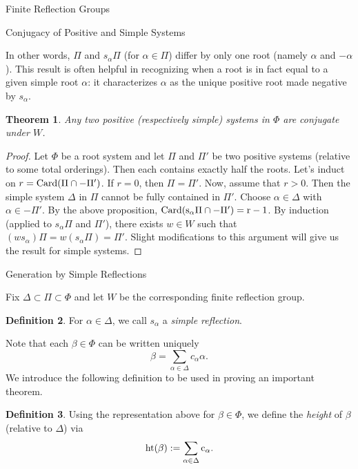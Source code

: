 \documentclass[12pt]{nauthesis}
\newtheorem{theorem}{Theorem}[section]
\theoremstyle{definition}
\newtheorem{definition}[theorem]{Definition}
\renewcommand{\(}{\big(}
\renewcommand{\)}{\big)}
\begin{document}
\begin{flushleft}
\begin{chapter}{Finite Reflection Groups}
\begin{section}{Conjugacy of Positive and Simple Systems}
\medskip

In other words, $\Pi$ and $s_\alpha\Pi$ (for $\alpha \in \Pi$) differ by only one root (namely $\alpha$ and $-\alpha$).  This result is often helpful in recognizing when a root is in fact equal to a given simple root $\alpha$: it characterizes $\alpha$ as the unique positive root made negative by $s_\alpha$.

\medskip

\begin{theorem}
Any two positive (respectively simple) systems in $\Phi$ are conjugate under $W$.
\end{theorem}

\begin{proof}
Let $\Phi$ be a root system and let $\Pi$ and $\Pi'$ be two positive systems (relative to some total orderings).  Then each contains exactly half the roots.  Let's induct on $r=\rm{Card}(\Pi \cap -\Pi')$.  If $r=0$, then $\Pi=\Pi'$.  Now, assume that $r>0$.  Then the simple system $\Delta$ in $\Pi$ cannot be fully contained in $\Pi'$.  Choose $\alpha \in \Delta$ with $\alpha \in -\Pi'$.  By the above proposition, $\rm{Card}(s_\alpha\Pi \cap -\Pi')=r-1$.  By induction (applied to $s_\alpha\Pi$ and $\Pi'$), there exists $w \in W$ such that $(ws_\alpha)\Pi=w(s_\alpha\Pi)=\Pi'$.  Slight modifications to this argument will give us the result for simple systems.
\end{proof}

\end{section}

\begin{section}{Generation by Simple Reflections}

Fix $\Delta \subset \Pi \subset \Phi$ and let $W$ be the corresponding finite reflection group.

\medskip

\begin{definition}
For $\alpha \in \Delta$, we call $s_\alpha$ a \emph{simple reflection}.
\end{definition}

\medskip

Note that each $\beta \in \Phi$ can be written uniquely
	$$\beta=\sum_{\alpha \in \Delta} c_\alpha \alpha.$$
We introduce the following definition to be used in proving an important theorem.

\medskip

\begin{definition}
Using the representation above for $\beta \in \Phi$, we define the \emph{height} of $\beta$ (relative to $\Delta$) via 
	$$\rm{ht}(\beta):=\sum_{\alpha \in \Delta} c_\alpha.$$
\end{definition}


\end{section}
\end{chapter}
\end{flushleft}
\end{document}

